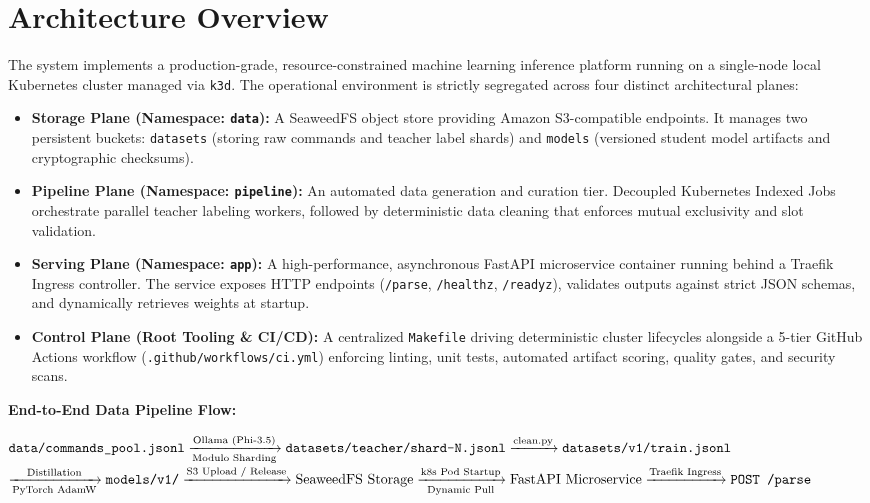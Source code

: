 \documentclass[10pt,a4paper]{article}
\begin{document}
\section*{Architecture Overview}
The system implements a production-grade, resource-constrained machine learning inference platform running on a single-node local Kubernetes cluster managed via \texttt{k3d}. The operational environment is strictly segregated across four distinct architectural planes:
\begin{itemize}[noitemsep,topsep=2pt,leftmargin=*]
    \item \textbf{Storage Plane (Namespace: \texttt{data}):} A SeaweedFS object store providing Amazon S3-compatible endpoints. It manages two persistent buckets: \texttt{datasets} (storing raw commands and teacher label shards) and \texttt{models} (versioned student model artifacts and cryptographic checksums).
    \item \textbf{Pipeline Plane (Namespace: \texttt{pipeline}):} An automated data generation and curation tier. Decoupled Kubernetes Indexed Jobs orchestrate parallel teacher labeling workers, followed by deterministic data cleaning that enforces mutual exclusivity and slot validation.
    \item \textbf{Serving Plane (Namespace: \texttt{app}):} A high-performance, asynchronous FastAPI microservice container running behind a Traefik Ingress controller. The service exposes HTTP endpoints (\texttt{/parse}, \texttt{/healthz}, \texttt{/readyz}), validates outputs against strict JSON schemas, and dynamically retrieves weights at startup.
    \item \textbf{Control Plane (Root Tooling \& CI/CD):} A centralized \texttt{Makefile} driving deterministic cluster lifecycles alongside a 5-tier GitHub Actions workflow (\texttt{.github/workflows/ci.yml}) enforcing linting, unit tests, automated artifact scoring, quality gates, and security scans.
\end{itemize}

\textbf{End-to-End Data Pipeline Flow:}
\begin{center}
\small
$\text{\texttt{data/commands\_pool.jsonl}} \xrightarrow[\text{Modulo Sharding}]{\text{Ollama (Phi-3.5)}} \text{\texttt{datasets/teacher/shard-N.jsonl}} \xrightarrow{\text{clean.py}} \text{\texttt{datasets/v1/train.jsonl}}$ \\[4pt]
$\xrightarrow[\text{PyTorch AdamW}]{\text{Distillation}} \text{\texttt{models/v1/}} \xrightarrow{\text{S3 Upload / Release}} \text{SeaweedFS Storage} \xrightarrow[\text{Dynamic Pull}]{\text{k8s Pod Startup}} \text{FastAPI Microservice} \xrightarrow{\text{Traefik Ingress}} \text{\texttt{POST /parse}}$
\end{center}
\end{document}
